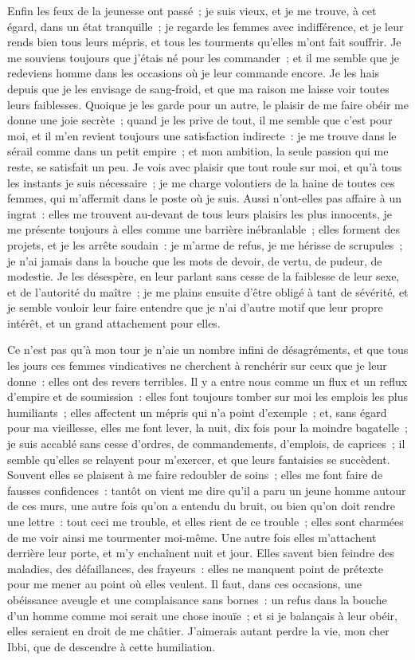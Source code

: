 \documentclass[french,twoside]{book} %
\begin{document}
Enfin les feux de la jeunesse ont passé ; je suis vieux, et je me trouve, à cet égard, dans un état tranquille ; je regarde les femmes avec indifférence, et je leur rends bien tous leurs mépris, et tous les tourments qu’elles m’ont fait souffrir. Je me souviens toujours que j’étais né pour les commander ; et il me semble que je redeviens homme dans les occasions où je leur commande encore. Je les hais depuis que je les envisage de sang-froid, et que ma raison me laisse voir toutes leurs faiblesses. Quoique je les garde pour un autre, le plaisir de me faire obéir me donne une joie secrète ; quand je les prive de tout, il me semble que c’est pour moi, et il m’en revient toujours une satisfaction indirecte : je me trouve dans le sérail comme dans un petit empire ; et mon ambition, la seule passion qui me reste, se satisfait un peu. Je vois avec plaisir que tout roule sur moi, et qu’à tous les instants je suis nécessaire ; je me charge volontiers de la haine de toutes ces femmes, qui m’affermit dans le poste où je suis. Aussi n’ont-elles pas affaire à un ingrat : elles me trouvent au-devant de tous leurs plaisirs les plus innocents, je me présente toujours à elles comme une barrière inébranlable ; elles forment des projets, et je les arrête soudain : je m’arme de refus, je me hérisse de scrupules ; je n’ai jamais dans la bouche que les mots de devoir, de vertu, de pudeur, de modestie. Je les désespère, en leur parlant sans cesse de la faiblesse de leur sexe, et de l’autorité du maître ; je me plains ensuite d’être obligé à tant de sévérité, et je semble vouloir leur faire entendre que je n’ai d’autre motif que leur propre intérêt, et un grand attachement pour elles.\par
Ce n’est pas qu’à mon tour je n’aie un nombre infini de désagréments, et que tous les jours ces femmes vindicatives ne cherchent à renchérir sur ceux que je leur donne : elles ont des revers terribles. Il y a entre nous comme un flux et un reflux d’empire et de soumission : elles font toujours tomber sur moi les emplois les plus humiliants ; elles affectent un mépris qui n’a point d’exemple ; et, sans égard pour ma vieillesse, elles me font lever, la nuit, dix fois pour la moindre bagatelle ; je suis accablé sans cesse d’ordres, de commandements, d’emplois, de caprices ; il semble qu’elles se relayent pour m’exercer, et que leurs fantaisies se succèdent. Souvent elles se plaisent à me faire redoubler de soins ; elles me font faire de fausses confidences : tantôt on vient me dire qu’il a paru un jeune homme autour de ces murs, une autre fois qu’on a entendu du bruit, ou bien qu’on doit rendre une lettre : tout ceci me trouble, et elles rient de ce trouble ; elles sont charmées de me voir ainsi me tourmenter moi-même. Une autre fois elles m’attachent derrière leur porte, et m’y enchaînent nuit et jour. Elles savent bien feindre des maladies, des défaillances, des frayeurs : elles ne manquent point de prétexte pour me mener au point où elles veulent. Il faut, dans ces occasions, une obéissance aveugle et une complaisance sans bornes : un refus dans la bouche d’un homme comme moi serait une chose inouïe ; et si je balançais à leur obéir, elles seraient en droit de me châtier. J’aimerais autant perdre la vie, mon cher Ibbi, que de descendre à cette humiliation.\par
\end{document}
